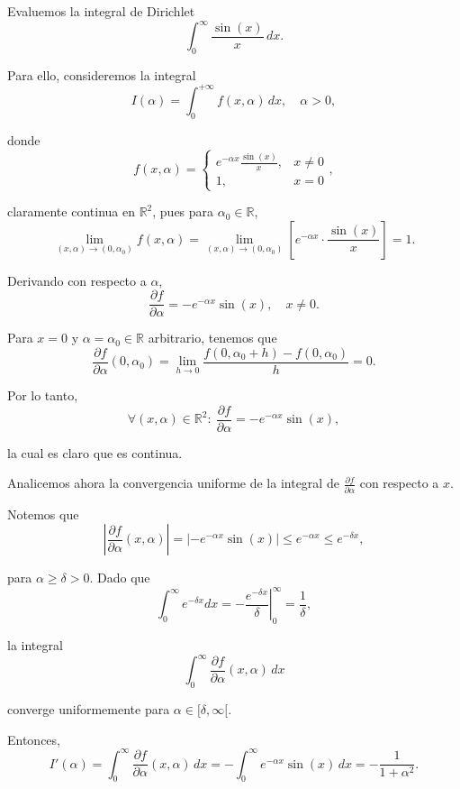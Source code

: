 \begin{ejemplo}
    Evaluemos la integral de Dirichlet
    $$\int_0^{\infty} \frac{\sin(x)}{x} \,dx.$$

    Para ello, consideremos la integral
    \begin{equation}
        I(\alpha) = \int_0^{+\infty} f(x,\alpha) \,dx, \quad \alpha > 0, \label{Ej2-Derivada-Integral1}
    \end{equation}

    donde 
    $$f(x,\alpha) = \left\{ \begin{array}{cl}
     e^{-\alpha x} \frac{\sin(x)}{x},& x \neq 0  \\
     1,& x = 0
\end{array} \right.,$$

claramente continua en $\mathbb{R}^2$, pues para $\alpha_0 \in \mathbb{R}$,
$$\lim_{(x,\alpha) \to (0,\alpha_0)} f(x,\alpha) = \lim_{(x,\alpha) \to (0,\alpha_0)} \left[  e^{-\alpha x} \cdot \frac{\sin(x)}{x} \right] = 1.$$

Derivando con respecto a $\alpha$,
$$\frac{\partial f}{\partial \alpha} = - e^{-\alpha x} \sin(x), \quad x \neq 0.$$

Para $x = 0$ y $\alpha = \alpha_0 \in \mathbb{R}$ arbitrario, tenemos que
$$\frac{\partial f}{\partial \alpha}(0,\alpha_0) = \lim_{h\to 0} \frac{f(0,\alpha_0 + h) - f(0,\alpha_0)}{h} = 0.$$

Por lo tanto,
$$\forall (x,\alpha) \in \mathbb{R}^2: ~ \frac{\partial f}{\partial \alpha} = - e^{-\alpha x} \sin(x),$$

la cual es claro que es continua. 

Analicemos ahora la convergencia uniforme de la integral de $\frac{\partial f}{\partial \alpha}$ con respecto a $x$.

Notemos que
$$\left| \frac{\partial f}{\partial \alpha}(x,\alpha) \right| = \left|  - e^{-\alpha x} \sin(x)\right| \leq e^{-\alpha x} \leq e^{-\delta x},$$

para $\alpha \geq \delta > 0$. Dado que
$$\int_{0}^{\infty} e^{-\delta x} dx = \left. - \frac{e^{-\delta x}}{\delta} \right|_{0}^{\infty} = \frac{1}{\delta},$$

la integral 
$$\int_{0}^{\infty} \frac{\partial f}{\partial \alpha}(x,\alpha) \,dx$$

converge uniformemente para $\alpha \in [\delta, \infty[$.

Entonces,
$$I'(\alpha) =  \int_{0}^{\infty} \frac{\partial f}{\partial \alpha}(x,\alpha) \,dx = - \int_0^{\infty} e^{-\alpha x} \sin(x) \,dx = - \frac{1}{1+ \alpha^2}.$$


\end{ejemplo}
